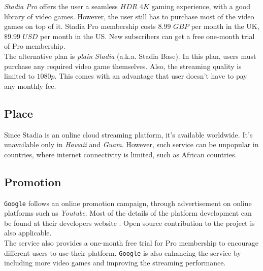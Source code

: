 \emph{Stadia Pro} offers the user a seamless $HDR$ $4K$ gaming experience, with a good library of video games. However, the user still has to purchase most of the video games on top of it. Stadia Pro membership costs $8.99$ $GBP$ per month in the UK, $\$9.99$ $USD$ per month in the US. New subscribers can get a free one-month trial of Pro membership. \\

The alternative plan is \emph{plain Stadia} (a.k.a. Stadia Base). In this plan, users must purchase any required video game themselves. Also, the streaming quality is limited to $1080p$. This comes with an advantage that user doesn't have to pay any monthly fee.

\subsection{Place}
Since Stadia is an online cloud streaming platform, it's available worldwide. It's unavailable only in \emph{Hawaii} and \emph{Guam}. However, such service can be unpopular in countries, where internet connectivity is limited, such as African countries.

\subsection{Promotion}
\texttt{Google} follows an online promotion campaign, through advertisement on online platforms such as \emph{Youtube}. Most of the details of the platform development can be found at their developers website \cite{stadia_website}. Open source contribution to the project is also applicable.  \\

The service also provides a one-month free trial for Pro membership to encourage different users to use their platform. \texttt{Google} is also enhancing the service by including more video games and improving the streaming performance.